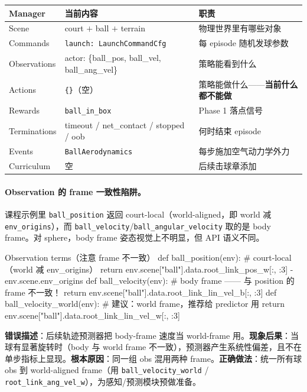 \begin{center}
\small
\begin{tabular}{@{}llp{5.2cm}@{}}
\toprule
Manager & 当前内容 & 职责 \\
\midrule
Scene & court $+$ ball $+$ terrain & 物理世界里有哪些对象 \\
Commands & \verb|launch: LaunchCommandCfg| & 每 episode 随机发球参数 \\
Observations & actor: \{ball\_pos, ball\_vel, ball\_ang\_vel\} & 策略能看到什么 \\
Actions & \verb|{}|（空） & 策略能做什么——\textbf{当前什么都不能做} \\
Rewards & \verb|ball_in_box| & Phase 1 落点信号 \\
Terminations & timeout / net\_contact / stopped / oob & 何时结束 episode \\
Events & \verb|BallAerodynamics| & 每步施加空气动力学外力 \\
Curriculum & 空 & 后续击球章添加 \\
\bottomrule
\end{tabular}
\end{center}

\paragraph{Observation 的 frame 一致性陷阱。}课程示例里 \verb|ball_position| 返回 court-local（world-aligned，即 world 减 \verb|env_origins|），而 \verb|ball_velocity|/\verb|ball_angular_velocity| 取的是 body frame。对 sphere，body frame 姿态视觉上不明显，但 API 语义不同。

\begin{codebox}[Python]{Observation terms（注意 frame 不一致）}
def ball_position(env):          # court-local（world 减 env_origins）
    return env.scene["ball"].data.root_link_pos_w[:, :3] - env.scene.env_origins
def ball_velocity(env):          # body frame —— 与 position 的 frame 不一致！
    return env.scene["ball"].data.root_link_lin_vel_b[:, :3]
def ball_velocity_world(env):    # 建议：world frame，推荐给 predictor 用
    return env.scene["ball"].data.root_link_lin_vel_w[:, :3]
\end{codebox}

\begin{pitfall}
\textbf{错误描述}：后续轨迹预测器把 body-frame 速度当 world-frame 用。\textbf{现象后果}：当球有显著旋转时（body 与 world frame 不一致），预测器产生系统性偏差，且不在单步指标上显现。\textbf{根本原因}：同一组 obs 混用两种 frame。\textbf{正确做法}：统一所有球 obs 到 world-aligned frame（用 \verb|ball_velocity_world| / \verb|root_link_ang_vel_w|），为感知/预测模块预做准备。
\end{pitfall}

